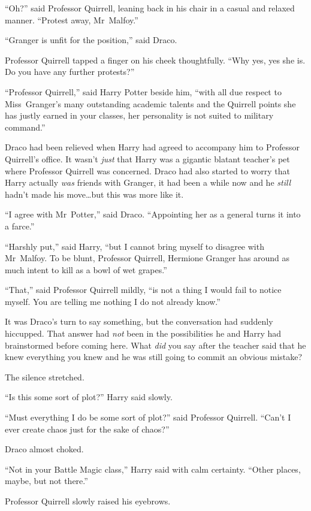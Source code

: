 “Oh?” said Professor Quirrell, leaning back in his chair in a casual and relaxed manner. “Protest away, Mr~Malfoy.”

“Granger is unfit for the position,” said Draco.

Professor Quirrell tapped a finger on his cheek thoughtfully. “Why yes, yes she is. Do you have any further protests?”

“Professor Quirrell,” said Harry Potter beside him, “with all due respect to Miss~Granger’s many outstanding academic talents and the Quirrell points she has justly earned in your classes, her personality is not suited to military command.”

Draco had been relieved when Harry had agreed to accompany him to Professor Quirrell’s office. It wasn’t \emph{just} that Harry was a gigantic blatant teacher’s pet where Professor Quirrell was concerned. Draco had also started to worry that Harry actually \emph{was} friends with Granger, it had been a while now and he \emph{still} hadn’t made his move…but this was more like it.

“I agree with Mr~Potter,” said Draco. “Appointing her as a general turns it into a farce.”

“Harshly put,” said Harry, “but I cannot bring myself to disagree with Mr~Malfoy. To be blunt, Professor Quirrell, Hermione Granger has around as much intent to kill as a bowl of wet grapes.”

“That,” said Professor Quirrell mildly, “is not a thing I would fail to notice myself. You are telling me nothing I do not already know.”

It was Draco’s turn to say something, but the conversation had suddenly hiccupped. That answer had \emph{not} been in the possibilities he and Harry had brainstormed before coming here. What \emph{did} you say after the teacher said that he knew everything you knew and he was still going to commit an obvious mistake?

The silence stretched.

“Is this some sort of plot?” Harry said slowly.

“Must everything I do be some sort of plot?” said Professor Quirrell. “Can’t I ever create chaos just for the sake of chaos?”

Draco almost choked.

“Not in your Battle Magic class,” Harry said with calm certainty. “Other places, maybe, but not there.”

Professor Quirrell slowly raised his eyebrows.


